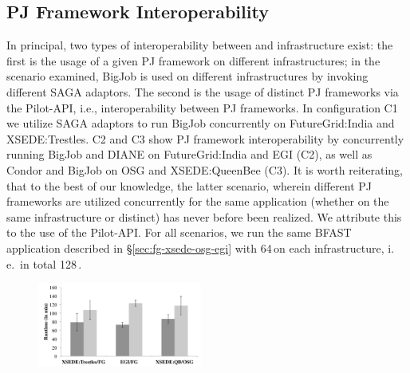 \documentclass[conference]{IEEEtran}
\begin{document}



\subsection{PJ Framework Interoperability}
\label{sec:experiment-interop}


In principal, two types of interoperability between \pilotjobs and
infrastructure exist: the first is the usage of a given PJ framework
on different infrastructures; in the scenario examined, BigJob is used
on different infrastructures by invoking different SAGA adaptors.  The
second is the usage of distinct PJ frameworks via the Pilot-API, i.e.,
interoperability between PJ frameworks. In configuration C1 we utilize
SAGA adaptors to run BigJob concurrently on FutureGrid:India and
XSEDE:Trestles. C2 and C3 show PJ framework interoperability by
concurrently running BigJob and DIANE on FutureGrid:India and EGI
(C2), as well as Condor and BigJob on OSG and XSEDE:QueenBee (C3). It
is worth reiterating, that to the best of our knowledge, the latter
scenario, wherein different PJ frameworks are utilized concurrently
for the same application (whether on the same infrastructure or
distinct) has never before been realized. We attribute this to the use
of the Pilot-API.  For all scenarios, we run the same BFAST
application described in \S\ref{sec:fg-xsede-osg-egi} with 64\,\cus on
each infrastructure, i.\,e.\ in total 128\,\cus.

\begin{figure}[htbp]
  \upp
  	\centering
	\includegraphics[width=0.48\textwidth]{../perf/interop/128-bfast-interop-with-staging.pdf}
	\caption{}
	\label{fig:perf_interop_128-bfast-interop}
\end{figure}
\end{document}
